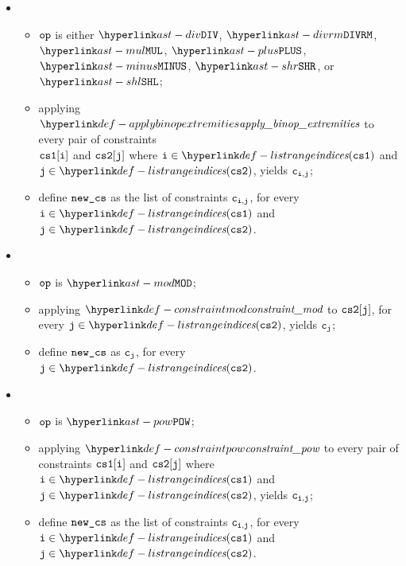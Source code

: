 \ProseParagraph
\OneApplies
\begin{itemize}
  \item {}
  \begin{itemize}
    \item $\op$ is either $\DIV$, $\DIVRM$, $\MUL$, $\PLUS$, $\MINUS$, $\SHR$, or $\SHL$;
    \item applying $\applybinopextremities$ to every pair of constraints \\
          $\csone[\vi]$ and $\cstwo[\vj]$ where $\vi\in\listrange(\csone)$ and
          $\vj\in\listrange(\cstwo)$, yields $\vc_{\vi,\vj}$;
    \item define $\newcs$ as the list of constraints $\vc_{\vi,\vj}$, for every
          $\vi\in\listrange(\csone)$ and $\vj\in\listrange(\cstwo)$.
  \end{itemize}

  \item {}
  \begin{itemize}
    \item $\op$ is $\MOD$;
    \item applying $\constraintmod$ to $\cstwo[\vj]$, for every $\vj\in\listrange(\cstwo)$, yields $\vc_\vj$;
    \item define $\newcs$ as $\vc_\vj$, for every $\vj\in\listrange(\cstwo)$.
  \end{itemize}

  \item {}
  \begin{itemize}
    \item $\op$ is $\POW$;
    \item applying $\constraintpow$ to every pair of constraints $\csone[\vi]$ and $\cstwo[\vj]$
          where $\vi\in\listrange(\csone)$ and $\vj\in\listrange(\cstwo)$, yields $\vc_{\vi,\vj}$;
    \item define $\newcs$ as the list of constraints $\vc_{\vi,\vj}$, for every
          $\vi\in\listrange(\csone)$ and $\vj\in\listrange(\cstwo)$.
  \end{itemize}
\end{itemize}

\FormallyParagraph
\begin{mathpar}
\end{mathpar}

